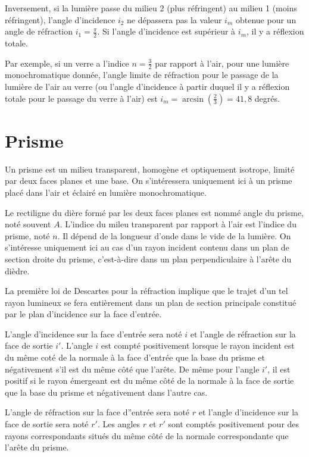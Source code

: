 Inversement, si la lumière passe du milieu 2 (plus réfringent) au milieu 1 (moins réfringent), l'angle d'incidence \(i_2\) ne dépassera pas la valeur \(i_m\) obtenue pour un angle de réfraction \(i_1 = \frac{\pi}{2}\). Si l'angle d'incidence est supérieur à \(i_m\), il y a réflexion totale.

Par exemple, si un verre a l'indice \(n=\frac{3}{2}\) par rapport à l'air, pour une lumière monochromatique donnée, l'angle limite de réfraction pour le passage de la lumière de l'air au verre (ou l'angle d'incidence à partir duquel il y a réflexion totale pour le passage du verre à l'air) est \(i_m = \arcsin\left(\frac{2}{3}\right) = 41,8\)
 degrés.
\section{Prisme}\label{chap6-sec:prisme}

Un prisme est un milieu transparent, homogène et optiquement isotrope, limité par deux faces planes et une base. On s'intéressera uniquement ici à un prisme placé dans l'air et éclairé en lumière monochromatique.

Le rectiligne du dière formé par les deux faces planes est nommé angle du prisme, noté souvent \(A\). L'indice du mileu transparent par rapport à l'air est l'indice du prisme, noté \(n\). Il dépend de la longueur d'onde dans le vide de la lumière. On s'intéresse uniquement ici au cas d'un rayon incident contenu dans un plan de section droite du prisme, c'est-à-dire dans un plan perpendiculaire à l'arête du dièdre.

La première loi de Descartes pour la réfraction implique que le trajet d'un tel rayon lumineux se fera entièrement dans un plan de section principale constitué par le plan d'incidence sur la face d'entrée.

L'angle d'incidence sur la face d'entrée sera noté \(i\) et l'angle de réfraction sur la face de sortie \(i'\). L'angle \(i\) est compté positivement lorsque le rayon incident est du même coté de la normale à la face d'entrée que la base du prisme et négativement s'il est du même côté que l'arête. De même pour l'angle \(i'\), il est positif si le rayon émergeant est du même côté de la normale à la face de sortie que la base du prisme et négativement dans l'autre cas.

L'angle de réfraction sur la face d''entrée sera noté \(r\) et l'angle d'incidence sur la face de sortie sera noté \(r'\). Les angles \(r\) et \(r'\) sont comptés positivement pour des rayons correspondants situés du même côté de la normale correspondante que l'arête du prisme.

